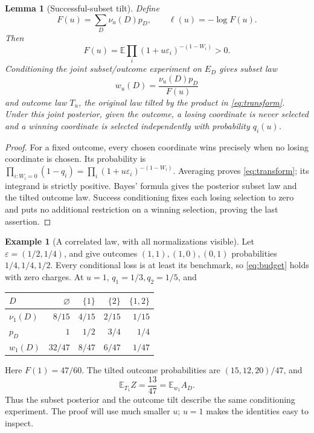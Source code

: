 \documentclass[11pt,reqno]{amsart}
\numberwithin{equation}{section}
\newtheorem{lemma}[theorem]{Lemma}
\theoremstyle{definition}
\newtheorem{example}[theorem]{Example}
\theoremstyle{remark}
\newcommand{\E}{\mathbb E}
\newcommand{\eps}{\varepsilon}
\begin{document}
\begin{lemma}[Successful-subset tilt]\label{lem:tilt}
Define
\[
 F(u)=\sum_D\nu_u(D)p_D,\qquad \ell(u)=-\log F(u).
\]
Then
\begin{equation}\label{eq:transform}
 F(u)=\E\prod_i(1+u\eps_i)^{-(1-W_i)}>0.
\end{equation}
Conditioning the joint subset/outcome experiment on \(E_D\) gives subset law
\[
 w_u(D)=\frac{\nu_u(D)p_D}{F(u)}
\]
and outcome law \(T_u\), the original law tilted by the product in \eqref{eq:transform}. Under this joint posterior, given the outcome, a losing coordinate is never selected and a winning coordinate is selected independently with probability \(q_i(u)\).
\end{lemma}
\begin{proof}
For a fixed outcome, every chosen coordinate wins precisely when no losing coordinate is chosen. Its probability is
\(\prod_{i:W_i=0}(1-q_i)=\prod_i(1+u\eps_i)^{-(1-W_i)}\).
Averaging proves \eqref{eq:transform}; its integrand is strictly positive. Bayes' formula gives the posterior subset law and the tilted outcome law. Success conditioning fixes each losing selection to zero and puts no additional restriction on a winning selection, proving the last assertion.
\end{proof}

\begin{example}[A correlated law, with all normalizations visible]\label{ex:tilt}
Let \(\eps=(1/2,1/4)\), and give outcomes \((1,1),(1,0),(0,1)\) probabilities \(1/4,1/4,1/2\). Every conditional loss is at least its benchmark, so \eqref{eq:budget} holds with zero charges. At \(u=1\), \(q_1=1/3,q_2=1/5\), and
\begin{center}
\begin{tabular}{lrrrr}
\toprule
\(D\)&\(\varnothing\)&\(\{1\}\)&\(\{2\}\)&\(\{1,2\}\)\\
\midrule
\(\nu_1(D)\)&\(8/15\)&\(4/15\)&\(2/15\)&\(1/15\)\\
\(p_D\)&\(1\)&\(1/2\)&\(3/4\)&\(1/4\)\\
\(w_1(D)\)&\(32/47\)&\(8/47\)&\(6/47\)&\(1/47\)\\
\bottomrule
\end{tabular}
\end{center}
Here \(F(1)=47/60\). The tilted outcome probabilities are
\((15,12,20)/47\), and
\[
 \E_{T_1}Z=\frac{13}{47}=\E_{w_1}A_D.
\]
Thus the subset posterior and the outcome tilt describe the same conditioning experiment. The proof will use much smaller \(u\); \(u=1\) makes the identities easy to inspect.
\end{example}
\end{document}
